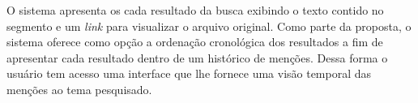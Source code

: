 O sistema apresenta os cada resultado da busca exibindo o texto contido no segmento e um \textit{link} para visualizar o arquivo original.	
Como parte da proposta, o sistema oferece como opção a ordenação cronológica dos resultados a fim de apresentar cada resultado dentro de um histórico de menções. Dessa forma o usuário tem acesso uma interface que lhe fornece uma visão temporal das menções ao tema pesquisado.


















